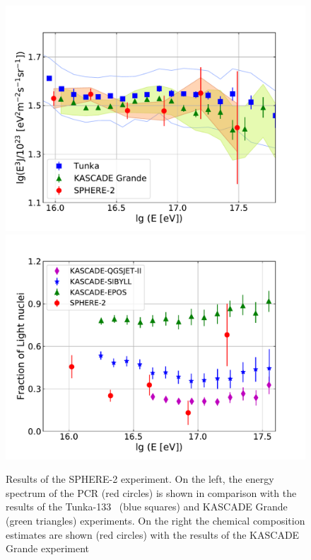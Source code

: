 \documentclass[a4paper,11pt]{article}
\begin{document}
\begin{figure}[t]
\centering %
\hfill
\includegraphics[height=.25\textheight]{sphere2spectrum.pdf}
\hfill
\includegraphics[height=.25\textheight]{sphere2composition.pdf}
\hfill
\caption{Results of the SPHERE-2 experiment. On the left, the energy spectrum of the PCR (red circles) is shown in comparison with the results of the Tunka-133~\cite{Tunka2020} (blue squares) and KASCADE Grande~\cite{Ape12} (green triangles) experiments. On the right the chemical composition estimates are shown (red circles) with the results of the KASCADE Grande experiment~\cite{Ape13}}
\label{fig:Sphere_results}
\end{figure}
\end{document}
